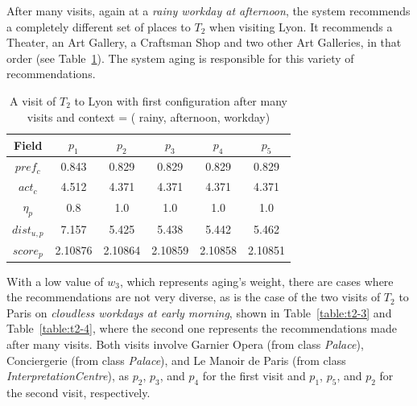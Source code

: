 After many visits, again at a {\it  rainy workday at afternoon}, the system recommends a completely different set of places to $T_2$ when visiting Lyon.
It recommends a Theater, an Art Gallery, a Craftsman Shop and two other Art Galleries, in that order (see Table~\ref{table:t2-2}). The system aging is responsible for this variety of recommendations.

\begin{table}[h!]
\vspace{-0.1cm}
\footnotesize{
    \centering
    \caption{A visit of $T_2$ to Lyon with first configuration after many visits and context = ( rainy, afternoon, workday)}
    \label{table:t2-2}
    \vspace{-0.3cm}
    \begin{tabular}{ |c|c|c|c|c|c| } 
        \hline
        Field   & $p_1$ & $p_2$ & $p_3$ & $p_4$ & $p_5$ \\
        \hline
        $pref_c$    &  0.843 & 0.829 & 0.829 & 0.829 & 0.829 \\
        $act_c$     & 4.512 & 4.371 & 4.371 & 4.371 & 4.371 \\
        $\eta_p$    & 0.8 & 1.0 & 1.0 & 1.0 & 1.0 \\
        $dist_{u,p}$ & 7.157 & 5.425 & 5.438 & 5.442 & 5.462 \\
        $score_p$    & 2.10876 & 2.10864 & 2.10859 & 2.10858 & 2.10851 \\
        
        \hline
    \end{tabular}
    }
    \vspace{-0.2cm}
\end{table}

With a low value of $w_3$, which represents aging's weight, there are cases where the recommendations are not very diverse, as is the case of the two visits of $T_2$ to Paris on {\it cloudless workdays at early morning}, shown in Table~\ref{table:t2-3} and Table~\ref{table:t2-4}, where the second one represents the recommendations made after many visits.
Both visits involve Garnier Opera (from class \textit{Palace}), Conciergerie (from class \textit{Palace}), and Le Manoir de Paris (from class \textit{InterpretationCentre}), as $p_2$, $p_3$, and $p_4$ for the first visit and $p_1$, $p_5$, and $p_2$ for the second visit, respectively.

